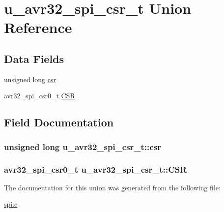 \hypertarget{unionu__avr32__spi__csr__t}{
\section{u\-\_\-avr32\-\_\-spi\-\_\-csr\-\_\-t \-Union \-Reference}
\label{unionu__avr32__spi__csr__t}
}
\subsection*{\-Data \-Fields}
\begin{DoxyCompactItemize}
\item 
unsigned long \hyperlink{unionu__avr32__spi__csr__t_a119d7f344181184203fc1b94d2058fcf}{csr}
\item 
avr32\-\_\-spi\-\_\-csr0\-\_\-t \hyperlink{unionu__avr32__spi__csr__t_a91cbf745f9d3075ad2c9f1bd628fc687}{\-C\-S\-R}
\end{DoxyCompactItemize}


\subsection{\-Field \-Documentation}
\hypertarget{unionu__avr32__spi__csr__t_a119d7f344181184203fc1b94d2058fcf}{
\subsubsection[{csr}]{\setlength{\rightskip}{0pt plus 5cm}unsigned long {\bf u\-\_\-avr32\-\_\-spi\-\_\-csr\-\_\-t\-::csr}}}
\label{unionu__avr32__spi__csr__t_a119d7f344181184203fc1b94d2058fcf}
\hypertarget{unionu__avr32__spi__csr__t_a91cbf745f9d3075ad2c9f1bd628fc687}{
\subsubsection[{\-C\-S\-R}]{\setlength{\rightskip}{0pt plus 5cm}avr32\-\_\-spi\-\_\-csr0\-\_\-t {\bf u\-\_\-avr32\-\_\-spi\-\_\-csr\-\_\-t\-::\-C\-S\-R}}}
\label{unionu__avr32__spi__csr__t_a91cbf745f9d3075ad2c9f1bd628fc687}


\-The documentation for this union was generated from the following file\-:\begin{DoxyCompactItemize}
\item 
\hyperlink{spi_8c}{spi.\-c}\end{DoxyCompactItemize}
